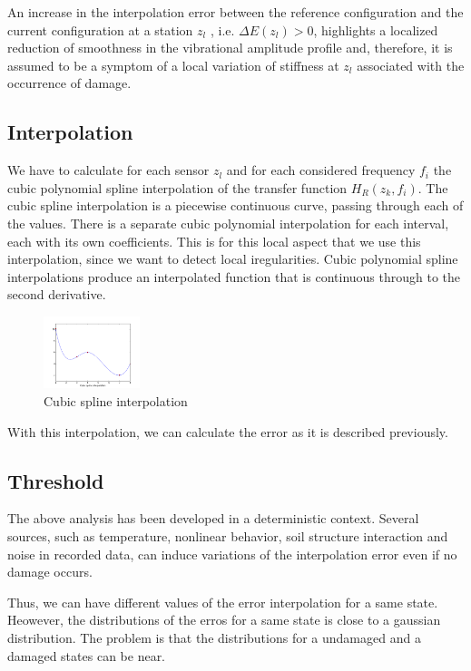 \documentclass[journal]{IEEEtran}
\begin{document}
An increase in the interpolation error between the reference configuration and the current configuration at a station $z_l$ , i.e.
$ \Delta E(z_l) > 0$, highlights a localized reduction of smoothness in the vibrational amplitude profile and, therefore, it is assumed
to be a symptom of a local variation of stiffness at $z_l$ associated with the occurrence of damage.

\subsection{Interpolation}

We have to calculate for each sensor $z_l$ and for each considered frequency $f_i$ the cubic polynomial spline interpolation of the transfer function $H_R(z_k,f_i)$.
The cubic spline interpolation is a piecewise continuous curve, passing through each of the values.
There is a separate cubic polynomial interpolation for each interval, each with its own coefficients.
This is for this local aspect that we use this interpolation, since we want to detect local iregularities.
Cubic polynomial spline interpolations produce an interpolated function that is continuous through to the second derivative.

\begin{figure}[h!]
  \centering
  \includegraphics[width=0.25\textwidth]{images/interpolation_spline.png}
  \caption{Cubic spline interpolation}
  \label{spline}
\end{figure}


With this interpolation, we can calculate the error as it is described previously.


\subsection{Threshold}

The above analysis has been developed in a deterministic context. Several sources, such as temperature, nonlinear
behavior, soil structure interaction and noise in recorded data, can induce variations of the interpolation error even if no
damage occurs.

Thus, we can have different values of the error interpolation for a same state. Heowever, the distributions of the erros for a same state is close to a gaussian distribution. The problem is that the distributions for a undamaged and a damaged states can be near.
\end{document}
